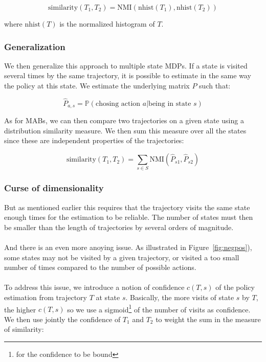 \documentclass{article}
\begin{document}
\[
\text{similarity}(T_1, T_2) = \text{NMI}(\text{nhist}(T_1), \text{nhist}(T_2))
\]

where $\text{nhist}(T)$ is the normalized histogram of $T$.

\subsubsection{Generalization}

We then generalize this approach to multiple state MDPs. If a state is visited several times by the same trajectory, it is possible to estimate in the same way the policy at this state. We estimate the underlying matrix $P$ such that:

\[
\hat P_{a,s} = \mathbb P(\text{chosing action } a | \text{being in state } s)
\]

As for MABs, we can then compare two trajectories on a given state using a distribution similarity measure. We then sum this measure over all the states since these are independent properties of the trajectories:

\[
\text{similarity}(T_1, T_2) = \sum_{s \in S}\text{NMI}(\hat P_{s1}, \hat P_{s2})
\]

\subsubsection{Curse of dimensionality}

But as mentioned earlier this requires that the trajectory visits the same state enough times for the estimation to be reliable. The number of states must then be smaller than the length of trajectories by several orders of magnitude.

\paragraph{}
And there is an even more anoying issue. As illustrated in Figure~\ref{fig:negpos}), some states may not be visited by a given trajectory, or visited a too small number of times compared to the number of possible actions.

\paragraph{}
To address this issue, we introduce a notion of confidence $c(T,s)$ of the policy estimation from trajectory $T$ at state $s$. Basically, the more visits of state $s$ by $T$, the higher $c(T,s)$ so we use a sigmoid\footnote{for the confidence to be bound} of the number of visits as confidence. We then use jointly the confidence of $T_1$ and $T_2$ to weight the sum in the measure of similarity:
\end{document}

